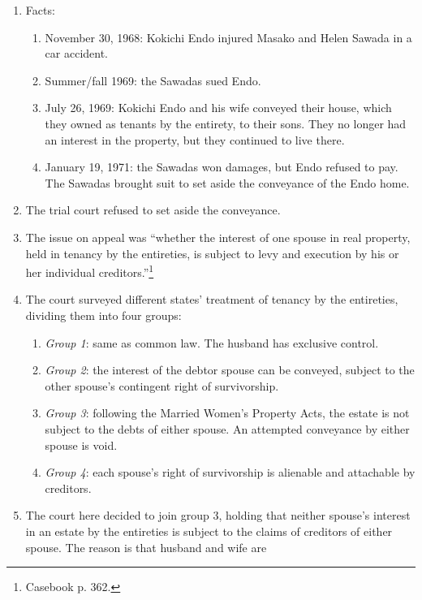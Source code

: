 \begin{enumerate}
    \item Facts:
    \begin{enumerate}
        \item November 30, 1968: Kokichi Endo injured Masako and Helen Sawada 
        in a car accident.
        \item Summer/fall 1969: the Sawadas sued Endo.
        \item July 26, 1969: Kokichi Endo and his wife conveyed their house, 
        which they owned as tenants by the entirety, to their sons. They no 
        longer had an interest in the property, but they continued to live 
        there.
        \item January 19, 1971: the Sawadas won damages, but Endo refused to 
        pay.  The Sawadas brought suit to set aside the conveyance of the Endo 
        home.
    \end{enumerate}
    \item The trial court refused to set aside the conveyance.
    \item The issue on appeal was ``whether the interest of one spouse in real 
    property, held in tenancy by the entireties, is subject to levy and 
    execution by his or her individual creditors.''\footnote{Casebook p. 362.}
    \item The court surveyed different states' treatment of tenancy by the 
    entireties, dividing them into four groups:
    \begin{enumerate}
        \item \emph{Group 1}: same as common law. The husband has exclusive 
        control.
        \item \emph{Group 2}: the interest of the debtor spouse can be 
        conveyed, subject to the other spouse's contingent right of 
        survivorship.
        \item \emph{Group 3}: following the Married Women's Property Acts, the 
        estate is not subject to the debts of either spouse. An attempted 
        conveyance by either spouse is void.
        \item \emph{Group 4}: each spouse's right of survivorship is alienable 
        and attachable by creditors.
    \end{enumerate}
    \item The court here decided to join group 3, holding that neither 
    spouse's interest in an estate by the entireties is subject to the claims 
    of creditors of either spouse. The reason is that husband and wife are 

\end{enumerate}
